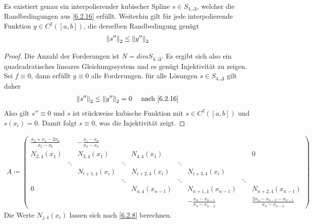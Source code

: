 \begin{Kore}\label{6.2.17}
  Es existiert genau ein interpolierender kubischer Spline 
  $s\in S_{4,\Delta}$, welcher die Randbedingungen aus \ref{6.2.16}
  erfüllt.
  Weiterhin gilt für jede interpolierende Funktion $y\in C^2([a,b])$,
  die derselben Randbedingung genügt
  \begin{gather*}
    \left\| s'' \right\|_2 \leq \left\| y'' \right\|_2
  \end{gather*}

  \begin{proof}
    Die Anzahl der Forderungen ist $N=dim S_{4,\Delta}$.
    Es ergibt sich also ein quadradratisches lineares Gleichungssystem
    und es genügt Injektivität zu zeigen.\\
    Sei $f\equiv 0$, dann erfüllt $y\equiv 0$ alle Forderungen.
    für alle Lösungen $s\in S_{4,\Delta}$ gilt daher
    \begin{gather*}
      \left\| s'' \right\|_2\leq \left\| y'' \right\|_2 =0 \quad \text{ nach \ref{6.2.16}}
    \end{gather*}
    Also gilt $s''\equiv 0$ und $s$ ist stückweise kubische Funktion
    mit $s\in C^2([a,b])$  und $s(x_i)=0$.
    Damit folgt $s\equiv 0$, was die Injektivität zeigt.
  \end{proof}
\end{Kore}



\label{5.2.18}
\begin{gather*}
  A \coloneqq 
  \left(\begin{array}{ccccccccc}
          \frac{x_2+x_1-2x_0}{x_2-x_0}& & -\frac{x_1-x_0}{x_2-x_0}& && & & & \\
          N_{2,4}(x_1)&&N_{3,4}(x_1) &&N_{4,4}(x_1)  & &&&0 \\
                                      &\ddots & &\ddots& &\ddots &  &&\\
                                      & & N_{i+1,4}(x_i)&& N_{i+2,4}(x_i) && N_{i+3,4}(x_i) && \\
                                      & &  &\ddots& &\ddots &&\ddots  &\\
          0&&&  &N_{n,4}(x_{n-1}) &&N_{n+1,4}(x_{n-1}) &&N_{n+2,4}(x_{n-1}) \\
                                      & & && && -\frac{x_n-x_{n-1}}{x_n-x_{n-2}} && \frac{2
                                                                                    x_n-x_{n-2}-x_{n-1}}{x_n-x_{n-2}}
        \end{array}\right)
    \end{gather*}
    Die Werte $N_{j,4}(x_i)$ lassen sich nach \ref{6.2.8} berechnen.


